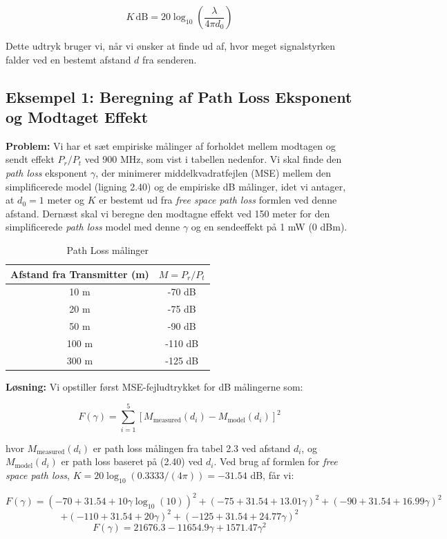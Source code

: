 \documentclass[a4paper,12pt]{book}
\begin{document}
	\[
	K \, \text{dB} = 20 \log_{10} \left(\frac{\lambda}{4\pi d_0}\right)
	\]
	
	\noindent Dette udtryk bruger vi, når vi ønsker at finde ud af, hvor meget signalstyrken falder ved en bestemt afstand \( d \) fra senderen.
	
	\subsection{Eksempel 1: Beregning af Path Loss Eksponent og Modtaget Effekt}
	\textbf{Problem:} Vi har et sæt empiriske målinger af forholdet mellem modtagen og sendt effekt \( P_r/P_t \) ved 900 MHz, som vist i tabellen nedenfor. Vi skal finde den \textit{path loss} eksponent \( \gamma \), der minimerer middelkvadratfejlen (MSE) mellem den simplificerede model (ligning 2.40) og de empiriske dB målinger, idet vi antager, at \( d_0 = 1 \) meter og \( K \) er bestemt ud fra \textit{free space path loss} formlen ved denne afstand. Dernæst skal vi beregne den modtagne effekt ved 150 meter for den simplificerede \textit{path loss} model med denne \( \gamma \) og en sendeeffekt på 1 mW (0 dBm).
	
	\begin{table}[h]
		\centering
		\begin{tabular}{|c|c|}
			\hline
			Afstand fra Transmitter (m) & \( M = P_r/P_t \) \\
			\hline
			10 m & -70 dB \\
			20 m & -75 dB \\
			50 m & -90 dB \\
			100 m & -110 dB \\
			300 m & -125 dB \\
			\hline
		\end{tabular}
		\caption{Path Loss målinger}
	\end{table}
	
	\noindent\textbf{Løsning:} Vi opstiller først MSE-fejludtrykket for dB målingerne som:
	
	\[
	F(\gamma) = \sum_{i=1}^{5} \left[ M_{\text{measured}}(d_i) - M_{\text{model}}(d_i) \right]^2
	\]
	
	hvor \( M_{\text{measured}}(d_i) \) er path loss målingen fra tabel 2.3 ved afstand \( d_i \), og \( M_{\text{model}}(d_i) \) er path loss baseret på (2.40) ved \( d_i \). Ved brug af formlen for \textit{free space path loss}, \( K = 20 \log_{10}(0.3333/(4\pi)) = -31.54 \) dB, får vi:
	
	\[
	F(\gamma) = (-70 + 31.54 + 10\gamma \log_{10}(10))^2 + (-75 + 31.54 + 13.01\gamma)^2 + (-90 + 31.54 + 16.99\gamma)^2 
	\]
	\[
	+ (-110 + 31.54 + 20\gamma)^2 + (-125 + 31.54 + 24.77\gamma)^2 
	\]
	\[
	F(\gamma) = 21676.3 - 11654.9\gamma + 1571.47\gamma^2
	\]
	
\end{document}
